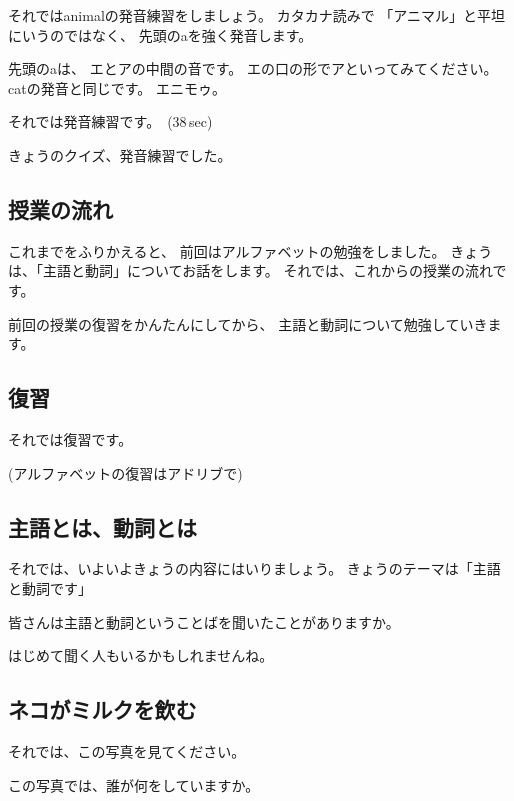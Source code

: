 \documentclass[12pt]{jlreq}
\begin{document}
それではanimalの発音練習をしましょう。
カタカナ読みで
「アニマル」と平坦にいうのではなく、
先頭のaを強く発音します。

先頭のaは、
エとアの中間の音です。
エの口の形でアといってみてください。
catの発音と同じです。
エニモゥ。

それでは発音練習です。
\faVolumeUp\,(38\,sec)

きょうのクイズ、発音練習でした。

{\large \ComputerMouse}

\newpage
\subsection{授業の流れ}

これまでをふりかえると、
前回はアルファベットの勉強をしました。
きょうは、「主語と動詞」についてお話をします。
それでは、これからの授業の流れです。

{\large \ComputerMouse}

前回の授業の復習をかんたんにしてから、
主語と動詞について勉強していきます。

{\large \ComputerMouse}

\subsection{復習}

それでは復習です。

{\large \ComputerMouse}

(アルファベットの復習はアドリブで)

{\large \ComputerMouse}

\subsection{主語とは、動詞とは}
それでは、いよいよきょうの内容にはいりましょう。
きょうのテーマは「主語と動詞です」

皆さんは主語と動詞ということばを聞いたことがありますか。

はじめて聞く人もいるかもしれませんね。

{\large \ComputerMouse}

\subsection{ネコがミルクを飲む}

それでは、この写真を見てください。

この写真では、誰が何をしていますか。
\end{document}
